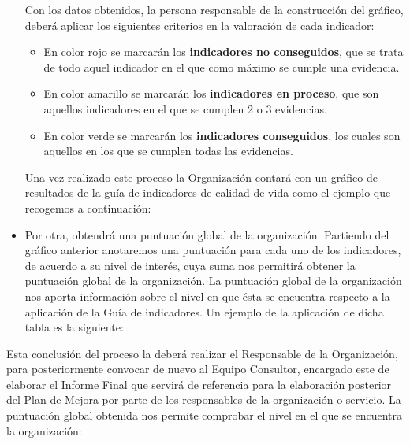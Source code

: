 \begin{itemize}
	Con los datos obtenidos, la persona responsable de la construcción del gráfico,
	deberá aplicar los siguientes criterios en la valoración de cada indicador:
	\begin{itemize}
		\item En color rojo se marcarán los \textbf{indicadores no conseguidos},
		que se trata de todo aquel indicador en el que como máximo se cumple una
		evidencia.
		\item En color amarillo se marcarán los \textbf{indicadores en proceso},
		que son aquellos indicadores en el que se cumplen 2 o 3 evidencias.
		\item En color verde se marcarán los \textbf{indicadores conseguidos},
		los cuales son aquellos en los que se cumplen todas las evidencias.
	\end{itemize}
	Una vez realizado este proceso la Organización contará con un gráfico de
	resultados de la guía de indicadores de calidad de vida como el ejemplo que
	recogemos a continuación:
	\item Por otra, obtendrá una puntuación global de la organización. Partiendo
	del gráfico anterior anotaremos una puntuación para cada uno de los
	indicadores, de acuerdo a su nivel de interés, cuya suma nos permitirá
	obtener la puntuación global de la organización.
	La puntuación global de la organización nos aporta información sobre el nivel
	en que ésta se encuentra respecto a la aplicación de la Guía de indicadores.
	Un ejemplo de la aplicación de dicha tabla es la siguiente:
\end{itemize}
Esta conclusión del proceso la deberá realizar el Responsable de la
Organización, para posteriormente convocar de nuevo al Equipo Consultor,
encargado este de elaborar el Informe Final que servirá de referencia para la
elaboración posterior del Plan de Mejora por parte de los responsables de la
organización o servicio.
La puntuación global obtenida nos permite comprobar el nivel en el que se
encuentra la organización:
